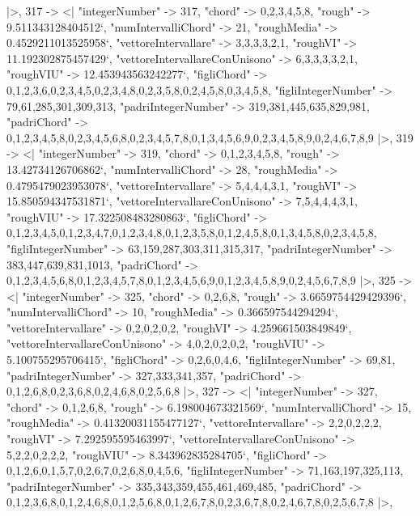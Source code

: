 \documentclass[
]{article}
\begin{document}
\begin{DatasetVerbatim}
  |>,
  317 -> <|
    "integerNumber" -> 317,
    "chord" -> {0,2,3,4,5,8},
    "rough" -> 9.511343128404512`,
    "numIntervalliChord" -> 21,
    "roughMedia" -> 0.4529211013525958`,
    "vettoreIntervallare" -> {3,3,3,3,2,1},
    "roughVI" -> 11.192302875457429`,
    "vettoreIntervallareConUnisono" -> {6,3,3,3,3,2,1},
    "roughVIU" -> 12.453943563242277`,
    "figliChord" -> {{0,1,2,3,6},{0,2,3,4,5},{0,2,3,4,8},{0,2,3,5,8},{0,2,4,5,8},{0,3,4,5,8}},
    "figliIntegerNumber" -> {79,61,285,301,309,313},
    "padriIntegerNumber" -> {319,381,445,635,829,981},
    "padriChord" -> {{0,1,2,3,4,5,8},{0,2,3,4,5,6,8},{0,2,3,4,5,7,8},{0,1,3,4,5,6,9},{0,2,3,4,5,8,9},{0,2,4,6,7,8,9}}
  |>,
  319 -> <|
    "integerNumber" -> 319,
    "chord" -> {0,1,2,3,4,5,8},
    "rough" -> 13.42734126706862`,
    "numIntervalliChord" -> 28,
    "roughMedia" -> 0.4795479023953078`,
    "vettoreIntervallare" -> {5,4,4,4,3,1},
    "roughVI" -> 15.850594347531871`,
    "vettoreIntervallareConUnisono" -> {7,5,4,4,4,3,1},
    "roughVIU" -> 17.322508483280863`,
    "figliChord" -> {{0,1,2,3,4,5},{0,1,2,3,4,7},{0,1,2,3,4,8},{0,1,2,3,5,8},{0,1,2,4,5,8},{0,1,3,4,5,8},{0,2,3,4,5,8}},
    "figliIntegerNumber" -> {63,159,287,303,311,315,317},
    "padriIntegerNumber" -> {383,447,639,831,1013},
    "padriChord" -> {{0,1,2,3,4,5,6,8},{0,1,2,3,4,5,7,8},{0,1,2,3,4,5,6,9},{0,1,2,3,4,5,8,9},{0,2,4,5,6,7,8,9}}
  |>,
  325 -> <|
    "integerNumber" -> 325,
    "chord" -> {0,2,6,8},
    "rough" -> 3.6659754429429396`,
    "numIntervalliChord" -> 10,
    "roughMedia" -> 0.366597544294294`,
    "vettoreIntervallare" -> {0,2,0,2,0,2},
    "roughVI" -> 4.259661503849849`,
    "vettoreIntervallareConUnisono" -> {4,0,2,0,2,0,2},
    "roughVIU" -> 5.100755295706415`,
    "figliChord" -> {{0,2,6},{0,4,6}},
    "figliIntegerNumber" -> {69,81},
    "padriIntegerNumber" -> {327,333,341,357},
    "padriChord" -> {{0,1,2,6,8},{0,2,3,6,8},{0,2,4,6,8},{0,2,5,6,8}}
  |>,
  327 -> <|
    "integerNumber" -> 327,
    "chord" -> {0,1,2,6,8},
    "rough" -> 6.198004673321569`,
    "numIntervalliChord" -> 15,
    "roughMedia" -> 0.41320031155477127`,
    "vettoreIntervallare" -> {2,2,0,2,2,2},
    "roughVI" -> 7.292595595463997`,
    "vettoreIntervallareConUnisono" -> {5,2,2,0,2,2,2},
    "roughVIU" -> 8.343962835284705`,
    "figliChord" -> {{0,1,2,6},{0,1,5,7},{0,2,6,7},{0,2,6,8},{0,4,5,6}},
    "figliIntegerNumber" -> {71,163,197,325,113},
    "padriIntegerNumber" -> {335,343,359,455,461,469,485},
    "padriChord" -> {{0,1,2,3,6,8},{0,1,2,4,6,8},{0,1,2,5,6,8},{0,1,2,6,7,8},{0,2,3,6,7,8},{0,2,4,6,7,8},{0,2,5,6,7,8}}
  |>,

\end{DatasetVerbatim}
\end{document}
